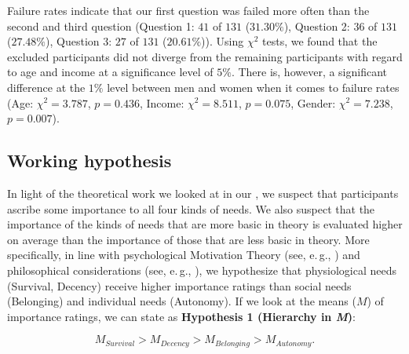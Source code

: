 \documentclass[10pt,letterpaper]{article}
\begin{document}
Failure rates indicate that our first question was failed more often than the second and third question (Question 1: $41$ of $131$ ($31.30\%$), Question 2: $36$ of $131$ ($27.48\%$), Question 3: $27$ of $131$ ($20.61\%$)).
Using $\chi^2$ tests, we found that the excluded participants did not diverge from the remaining participants with regard to age and income at a significance level of $5\%$.
There is, however, a significant difference at the $1\%$ level between men and women when it comes to failure rates (Age: $\chi^2=3.787$, $p=0.436$, Income: $\chi^2=8.511$, $p=0.075$, Gender: $\chi^2=7.238$, $p=0.007$).


\subsection*{Working hypothesis}\label{sec:study_1_hypothesis}
In light of the theoretical work we looked at in our , we suspect that participants ascribe some importance to all four kinds of needs.
We also suspect that the importance of the kinds of needs that are more basic in theory is evaluated higher on average than the importance of those that are less basic in theory.
More specifically, in line with psychological Motivation Theory (see, e.\,g., \cite{maslow_theory_1943,alderfer_empirical_1969}) and philosophical considerations (see, e.\,g., \cite{braybrooke_meeting_1987,wiggins_needs_1987,wiggins_what_1998}), we hypothesize that physiological needs (Survival, Decency) receive higher importance ratings than social needs (Belonging) and individual needs (Autonomy).
If we look at the means ($M$) of importance ratings, we can state as \textbf{Hypothesis 1 (Hierarchy in \textit{M})}:

\begin{equation}
   M_{Survival}>M_{Decency}>M_{Belonging}>M_{Autonomy}.
\end{equation}


\end{document}
